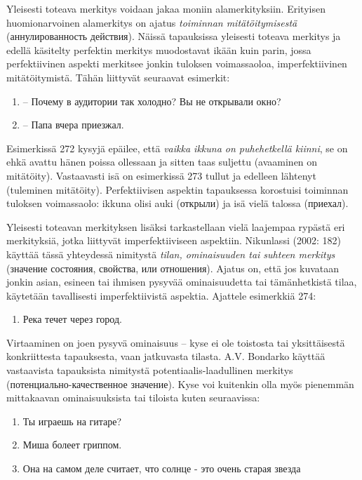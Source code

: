 \documentclass[]{scrreprt}
\providecommand{\tightlist}{%
  \setlength{\itemsep}{0pt}\setlength{\parskip}{0pt}}
\begin{document}
Yleisesti toteava merkitys voidaan jakaa moniin alamerkityksiin.
Erityisen huomionarvoinen alamerkitys on ajatus \emph{toiminnan
mitätöitymisestä} (аннулированность действия). Näissä tapauksissa
yleisesti toteava merkitys ja edellä käsitelty perfektin merkitys
muodostavat ikään kuin parin, jossa perfektiivinen aspekti merkitsee
jonkin tuloksen voimassaoloa, imperfektiivinen mitätöitymistä. Tähän
liittyvät seuraavat esimerkit:

\begin{enumerate}
\def\labelenumi{(\arabic{enumi})}
\setcounter{enumi}{271}
\tightlist
\item
  -- Почему в аудитории так холодно? Вы не открывали окно?
\item
  -- Папа вчера приезжал.
\end{enumerate}

Esimerkissä 272 kysyjä epäilee, että \emph{vaikka ikkuna on puhehetkellä
kiinni}, se on ehkä avattu hänen poissa ollessaan ja sitten taas
suljettu (avaaminen on mitätöity). Vastaavasti isä on esimerkissä 273
tullut ja edelleen lähtenyt (tuleminen mitätöity). Perfektiivisen
aspektin tapauksessa korostuisi toiminnan tuloksen voimassaolo: ikkuna
olisi auki (открыли) ja isä vielä talossa (приехал).

Yleisesti toteavan merkityksen lisäksi tarkastellaan vielä laajempaa
rypästä eri merkityksiä, jotka liittyvät imperfektiiviseen aspektiin.
Nikunlassi (2002: 182) käyttää tässä yhteydessä nimitystä \emph{tilan,
ominaisuuden tai suhteen merkitys} (значение состояния, свойства, или
отношения). Ajatus on, että jos kuvataan jonkin asian, esineen tai
ihmisen pysyvää ominaisuudetta tai tämänhetkistä tilaa, käytetään
tavallisesti imperfektiivistä aspektia. Ajattele esimerkkiä 274:

\begin{enumerate}
\def\labelenumi{(\arabic{enumi})}
\setcounter{enumi}{273}
\tightlist
\item
  Река течет через город.
\end{enumerate}

Virtaaminen on joen pysyvä ominaisuus -- kyse ei ole toistosta tai
yksittäisestä konkriittesta tapauksesta, vaan jatkuvasta tilasta. A.V.
Bondarko käyttää vastaavista tapauksista nimitystä
potentiaalis-laadullinen merkitys (потенциально-качественное значение).
Kyse voi kuitenkin olla myös pienemmän mittakaavan ominaisuuksista tai
tiloista kuten seuraavissa:

\begin{enumerate}
\def\labelenumi{(\arabic{enumi})}
\setcounter{enumi}{274}
\tightlist
\item
  Ты играешь на гитаре?
\item
  Миша болеет гриппом.
\item
  Она на самом деле считает, что солнце - это очень старая звезда
\end{enumerate}
\end{document}
